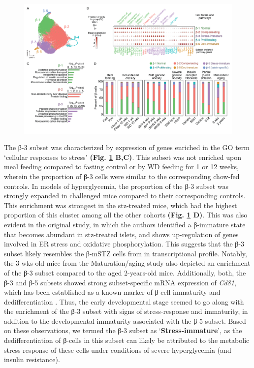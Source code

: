 \begin{figure}[t]
\centering
\includegraphics[width=\linewidth]{Chapter5/Fig/F3-1-v2-03.png}
\caption[Characterization of β-cell heterogeneity using subset-
enriched markers]{}
\label{fig:3-4}
\end{figure}

The β-3 subset was characterized by expression of genes enriched in the GO term `cellular responses to stress' \textbf{(Fig. \ref{fig:3-4} B,C)}. This subset was not enriched upon meal feeding compared to fasting control or by WD feeding for 1 or 12 weeks, wherein the proportion of β-3 cells were similar to the corresponding chow-fed controls. In models of hyperglycemia, the proportion of the β-3 subset was strongly expanded in challenged mice compared to their corresponding controls. This enrichment was strongest in the \gls{stz}-treated mice, which had the highest proportion of this cluster among all the other cohorts \textbf{(Fig. \ref{fig:3-4} D)}. This was also evident in the original study, in which the authors identified a β-immature state that becomes abundant in \gls{stz}-treated islets, and shows up-regulation of genes involved in ER stress and oxidative phosphorylation. This suggests that the β-3 subset likely resembles the β-mSTZ cells from \textbf{\cite{sachs_targeted_2020}} in transcriptional profile. Notably, the 3 wks old mice from the Maturation/aging study also depicted an enrichment of the β-3 subset compared to the aged 2-years-old mice. Additionally, both, the β-3 and β-5 subsets showed strong subset-specific mRNA expression of \textit{Cd81}, which has been established as a known marker of β-cell immaturity and dedifferentiation \textbf{\cite{salinno_cd81_2021}}. Thus, the early developmental stage seemed to go along with the enrichment of the β-3 subset with signs of stress-response and immaturity, in addition to the developmental immaturity associated with the β-5 subset. 
Based on these observations, we termed the β-3 subset as ‘\textbf{Stress-immature}’, as the dedifferentiation of β-cells in this subset can likely be attributed to the metabolic stress response of these cells under conditions of severe hyperglycemia (and insulin resistance).\\

